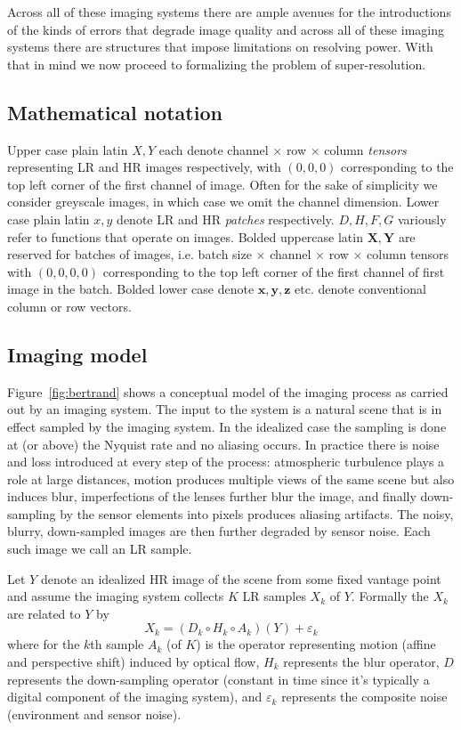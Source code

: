 Across all of these imaging systems there are ample avenues for the introductions of the kinds of errors that degrade image quality and across all of these imaging systems there are structures that impose limitations on resolving power.
%
With that in mind we now proceed to formalizing the problem of super-resolution.

\subsection{Mathematical notation}\label{subsec:notation}
Upper case plain latin $X, Y$ each denote channel $\times$ row $\times$ column \textit{tensors} representing LR and HR images respectively, with $(0, 0,0)$ corresponding to the top left corner of the first channel of image.
%
Often for the sake of simplicity we consider greyscale images, in which case we omit the channel dimension.
%
Lower case plain latin $x, y$ denote LR and HR \textit{patches} respectively.
%
$D, H, F, G$ variously refer to functions that operate on images.
%
Bolded uppercase latin $\bm{X}, \bm{Y}$ are reserved for batches of images, i.e. batch size $\times$ channel $\times$ row $\times$ column tensors with $(0, 0, 0,0)$ corresponding to the top left corner of the first channel of first image in the batch.
%
Bolded lower case denote $\bm{x}, \bm{y}, \bm{z}$ etc. denote conventional column or row vectors.

\subsection{Imaging model}\label{subsec:imaging-model}
Figure~\ref{fig:bertrand} shows a conceptual model of the imaging process as carried out by an imaging system.
%
The input to the system is a natural scene that is in effect sampled by the imaging system.
%
In the idealized case the sampling is done at (or above) the Nyquist rate and no aliasing occurs.
%
In practice there is noise and loss introduced at every step of the process: atmospheric turbulence plays a role at large distances, motion produces multiple views of the same scene but also induces blur, imperfections of the lenses further blur the image, and finally down-sampling by the sensor elements into pixels produces aliasing artifacts.
%
The noisy, blurry, down-sampled images are then further degraded by sensor noise.
%
Each such image we call an LR sample.

Let $Y$ denote an idealized HR image of the scene from some fixed vantage point and assume the imaging system collects $K$ LR samples $X_k$ of $Y$.
%
Formally the $X_k$ are related to $Y$ by
\begin{equation}
    X_k = (D_k \circ H_k \circ A_k) (Y) + \varepsilon_k
    \label{eqn:imagingmodel}
\end{equation}
where for the $k$th sample $A_k$ (of $K$) is the operator representing motion (affine and perspective shift) induced by optical flow, $H_k$ represents the blur operator, $D$ represents the down-sampling operator (constant in time since it's typically a digital component of the imaging system), and $\varepsilon_k$ represents the composite noise (environment and sensor noise).

